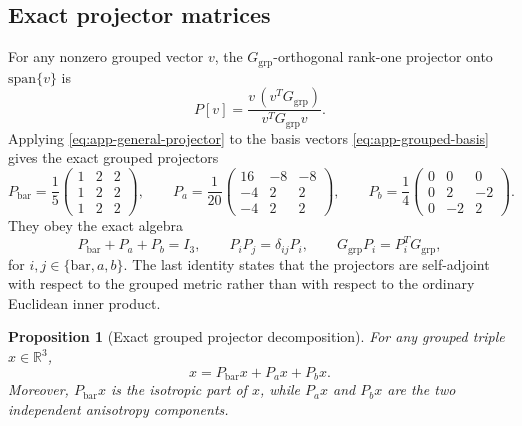 \documentclass[11pt]{article}
\newtheorem{proposition}[theorem]{Proposition}
\theoremstyle{definition}
\newcommand{\Span}{\mathrm{span}}
\newcommand{\bbR}{\mathbb R}
\begin{document}
\subsection{Exact projector matrices}

For any nonzero grouped vector $v$, the $G_{\mathrm{grp}}$-orthogonal rank-one projector onto $\Span\{v\}$ is
\begin{equation}
 P[v]=\frac{v\,(v^T G_{\mathrm{grp}})}{v^T G_{\mathrm{grp}} v}.
 \label{eq:app-general-projector}
\end{equation}
Applying \eqref{eq:app-general-projector} to the basis vectors \eqref{eq:app-grouped-basis} gives the exact grouped projectors
\begin{equation}
P_{\mathrm{bar}}=\frac15
\begin{pmatrix}
1&2&2\\
1&2&2\\
1&2&2
\end{pmatrix},
\qquad
P_a=\frac1{20}
\begin{pmatrix}
16&-8&-8\\
-4&2&2\\
-4&2&2
\end{pmatrix},
\qquad
P_b=\frac14
\begin{pmatrix}
0&0&0\\
0&2&-2\\
0&-2&2
\end{pmatrix}.
\label{eq:app-projector-matrices}
\end{equation}
They obey the exact algebra
\begin{equation}
 P_{\mathrm{bar}}+P_a+P_b=I_3,
 \qquad
 P_iP_j=\delta_{ij}P_i,
 \qquad
 G_{\mathrm{grp}}P_i=P_i^T G_{\mathrm{grp}},
 \label{eq:app-projector-algebra}
\end{equation}
for $i,j\in\{\mathrm{bar},a,b\}$. The last identity states that the projectors are self-adjoint with respect to the grouped metric rather than with respect to the ordinary Euclidean inner product.

\begin{proposition}[Exact grouped projector decomposition]
For any grouped triple $x\in\bbR^3$,
\begin{equation}
 x=P_{\mathrm{bar}}x+P_ax+P_bx.
 \label{eq:app-projector-decomposition}
\end{equation}
Moreover, $P_{\mathrm{bar}}x$ is the isotropic part of $x$, while $P_ax$ and $P_bx$ are the two independent anisotropy components.
\end{proposition}
\end{document}
